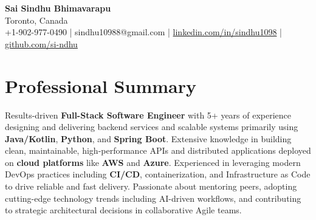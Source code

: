 \documentclass[letterpaper,11pt]{article}
\begin{document}
\begin{center}
  {\Large \textbf{Sai Sindhu Bhimavarapu}} \\
  Toronto, Canada \\
  +1-902-977-0490 \enspace | \enspace sindhu10988@gmail.com \enspace | \enspace \href{https://www.linkedin.com/in/sindhu1098/}{linkedin.com/in/sindhu1098} \enspace | \enspace \href{https://github.com/si-ndhu}{github.com/si-ndhu}
\end{center}

\section{Professional Summary}
  \begin{itemize}[leftmargin=0.15in, label={}]
    \small{\item{
     Results-driven \textbf{Full-Stack Software Engineer} with 5+ years of experience designing and delivering backend services and scalable systems primarily using \textbf{Java/Kotlin}, \textbf{Python}, and \textbf{Spring Boot}. Extensive knowledge in building clean, maintainable, high-performance APIs and distributed applications deployed on \textbf{cloud platforms} like \textbf{AWS} and \textbf{Azure}. Experienced in leveraging modern DevOps practices including \textbf{CI/CD}, containerization, and Infrastructure as Code to drive reliable and fast delivery. Passionate about mentoring peers, adopting cutting-edge technology trends including AI-driven workflows, and contributing to strategic architectural decisions in collaborative Agile teams.
    }}
  \end{itemize}
\vspace{-16pt}

\end{document}
